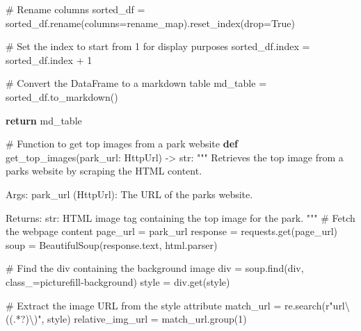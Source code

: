 \documentclass[
  letterpaper,
  DIV=11,
  numbers=noendperiod]{scrartcl}
\newenvironment{Shaded}{\begin{snugshade}}{\end{snugshade}}
\newcommand{\BuiltInTok}[1]{\textcolor[rgb]{0.00,0.23,0.31}{#1}}
\newcommand{\CommentTok}[1]{\textcolor[rgb]{0.37,0.37,0.37}{#1}}
\newcommand{\ControlFlowTok}[1]{\textcolor[rgb]{0.00,0.23,0.31}{\textbf{#1}}}
\newcommand{\DecValTok}[1]{\textcolor[rgb]{0.68,0.00,0.00}{#1}}
\newcommand{\KeywordTok}[1]{\textcolor[rgb]{0.00,0.23,0.31}{\textbf{#1}}}
\newcommand{\NormalTok}[1]{\textcolor[rgb]{0.00,0.23,0.31}{#1}}
\newcommand{\OperatorTok}[1]{\textcolor[rgb]{0.37,0.37,0.37}{#1}}
\newcommand{\StringTok}[1]{\textcolor[rgb]{0.13,0.47,0.30}{#1}}
\newcommand{\VariableTok}[1]{\textcolor[rgb]{0.07,0.07,0.07}{#1}}
\newcommand{\VerbatimStringTok}[1]{\textcolor[rgb]{0.13,0.47,0.30}{#1}}
\begin{document}
\begin{Shaded}
\begin{Highlighting}[]
    \CommentTok{\# Rename columns}
\NormalTok{    sorted\_df }\OperatorTok{=}\NormalTok{ sorted\_df.rename(columns}\OperatorTok{=}\NormalTok{rename\_map).reset\_index(drop}\OperatorTok{=}\VariableTok{True}\NormalTok{)}

    \CommentTok{\# Set the index to start from 1 for display purposes}
\NormalTok{    sorted\_df.index }\OperatorTok{=}\NormalTok{ sorted\_df.index }\OperatorTok{+} \DecValTok{1}

    \CommentTok{\# Convert the DataFrame to a markdown table}
\NormalTok{    md\_table }\OperatorTok{=}\NormalTok{ sorted\_df.to\_markdown()}

    \ControlFlowTok{return}\NormalTok{ md\_table}

\CommentTok{\# Function to get top images from a park website}
\KeywordTok{def}\NormalTok{ get\_top\_images(park\_url: HttpUrl) }\OperatorTok{{-}\textgreater{}} \BuiltInTok{str}\NormalTok{:}
    \CommentTok{"""}
\CommentTok{    Retrieves the top image from a park\textquotesingle{}s website by scraping the HTML content.}

\CommentTok{    Args:}
\CommentTok{        park\_url (HttpUrl): The URL of the park\textquotesingle{}s website.}

\CommentTok{    Returns:}
\CommentTok{        str: HTML image tag containing the top image for the park.}
\CommentTok{    """}
    \CommentTok{\# Fetch the webpage content}
\NormalTok{    page\_url }\OperatorTok{=}\NormalTok{ park\_url}
\NormalTok{    response }\OperatorTok{=}\NormalTok{ requests.get(page\_url)}
\NormalTok{    soup }\OperatorTok{=}\NormalTok{ BeautifulSoup(response.text, }\StringTok{\textquotesingle{}html.parser\textquotesingle{}}\NormalTok{)}

    \CommentTok{\# Find the div containing the background image}
\NormalTok{    div }\OperatorTok{=}\NormalTok{ soup.find(}\StringTok{\textquotesingle{}div\textquotesingle{}}\NormalTok{, class\_}\OperatorTok{=}\StringTok{\textquotesingle{}picturefill{-}background\textquotesingle{}}\NormalTok{)}
\NormalTok{    style }\OperatorTok{=}\NormalTok{ div.get(}\StringTok{\textquotesingle{}style\textquotesingle{}}\NormalTok{)}

    \CommentTok{\# Extract the image URL from the style attribute}
\NormalTok{    match\_url }\OperatorTok{=}\NormalTok{ re.search(}\VerbatimStringTok{r"url\textbackslash{}(\textquotesingle{}(.*?)\textquotesingle{}\textbackslash{})"}\NormalTok{, style)}
\NormalTok{    relative\_img\_url }\OperatorTok{=}\NormalTok{ match\_url.group(}\DecValTok{1}\NormalTok{)}


\end{Highlighting}
\end{Shaded}
\end{document}
